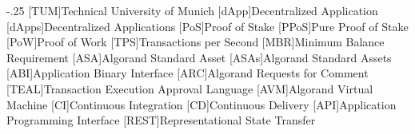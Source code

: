 \documentclass[headsepline,footsepline,footinclude=false,oneside,fontsize=11pt,paper=a4,listof=totoc,bibliography=totoc,parskip=half]{scrbook} %
\begin{document}


\frontmatter{}





\tableofcontents{}

\mainmatter{}








\appendix{}


\begin{acronym}
    \itemsep-.25\baselineskip
    [TUM]{Technical University of Munich}
    [dApp]{Decentralized Application}
    [dApps]{Decentralized Applications}
    [PoS]{Proof of Stake}
    [PPoS]{Pure Proof of Stake}
    [PoW]{Proof of Work}
    [TPS]{Transactions per Second}
    [MBR]{Minimum Balance Requirement}
    [ASA]{Algorand Standard Asset}
    [ASAs]{Algorand Standard Assets}
    [ABI]{Application Binary Interface}
    [ARC]{Algorand Requests for Comment}
    [TEAL]{Transaction Execution Approval Language}
    [AVM]{Algorand Virtual Machine}
    [CI]{Continuous Integration}
    [CD]{Continuous Delivery}
    [API]{Application Programming Interface}
    [REST]{Representational State Transfer}
\end{acronym}

\listoffigures{}
\listoftables{}
\printbibliography{}
\end{document}
